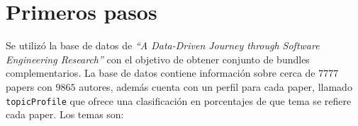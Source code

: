 \section{Primeros pasos}
{\begin{small}%
\begin{flushright}%
\it
\end{flushright}%
\end{small}%
\vspace{.5cm}}
Se utilizó la base de datos de \textit{\textquotedblleft A Data-Driven Journey through Software 
Engineering Research\textquotedblright}\cite{dataDrive} con el objetivo de obtener conjunto de bundles 
complementarios. La base de datos contiene información sobre cerca de $7777$ papers con $9865$ 
autores, además cuenta con un perfil para cada paper, llamado \texttt{topicProfile} que ofrece una 
clasificación en porcentajes de que tema se refiere cada paper. Los temas son:
